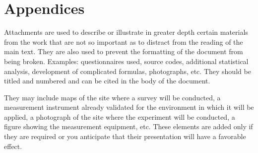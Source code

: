 \section*{Appendices}

Attachments are used to describe or illustrate in greater depth certain materials from the work that are not so important as to distract from the reading of the main text. They are also used to prevent the formatting of the document from being broken.
Examples: questionnaires used, source codes, additional statistical analysis, development of complicated formulas, photographs, etc. They should be titled and numbered and can be cited in the body of the document.

They may include maps of the site where a survey will be conducted, a measurement instrument already validated for the environment in which it will be applied, a photograph of the site where the experiment will be conducted, a figure showing the measurement equipment, etc. These elements are added only if they are required or you anticipate that their presentation will have a favorable effect.